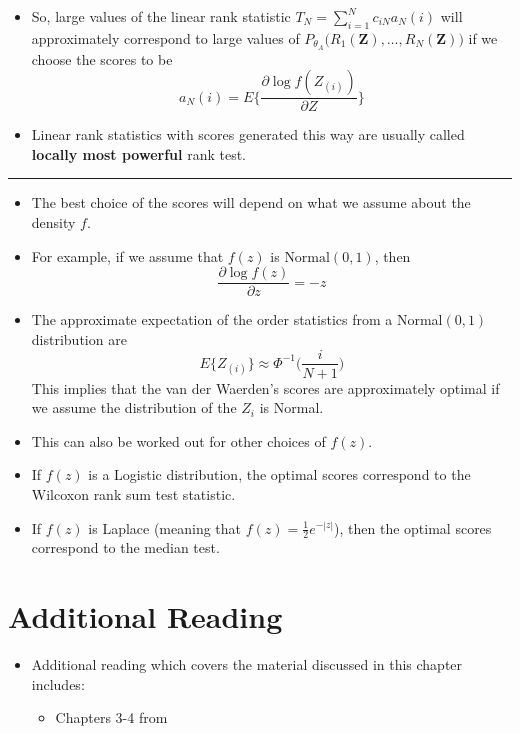 \documentclass[]{book}
\providecommand{\tightlist}{%
  \setlength{\itemsep}{0pt}\setlength{\parskip}{0pt}}
\begin{document}
\begin{itemize}
\item
  So, large values of the linear rank statistic \(T_{N} = \sum_{i=1}^{N} c_{iN} a_{N}(i)\) will approximately
  correspond to large values of \(P_{\theta_{A}}\Big( R_{1}(\mathbf{Z}), \ldots, R_{N}(\mathbf{Z}) \Big)\)
  if we choose the scores to be
  \begin{equation}
  a_{N}(i) = E\Bigg\{ \frac{\partial \log f(Z_{(i)})}{ \partial Z}  \Bigg\}
  \end{equation}
\item
  Linear rank statistics with scores generated this way are usually called
  \textbf{locally most powerful} rank test.
\end{itemize}

\begin{center}\rule{0.5\linewidth}{\linethickness}\end{center}

\begin{itemize}
\item
  The best choice of the scores will depend on what we assume about the density \(f\).
\item
  For example, if we assume that \(f(z)\) is \(\textrm{Normal}(0,1)\), then
  \begin{equation}
  \frac{\partial \log f(z)}{\partial z} = -z
  \end{equation}
\item
  The approximate expectation of the order statistics from a Normal\((0,1)\) distribution are
  \begin{equation}
  E\{ Z_{(i)} \} \approx \Phi^{-1}\Bigg( \frac{i}{N+1} \Bigg)
  \end{equation}
  This implies that the van der Waerden's scores are approximately optimal
  if we assume the distribution of the \(Z_{i}\) is Normal.
\item
  This can also be worked out for other choices of \(f(z)\).
\item
  If \(f(z)\) is a Logistic distribution, the optimal scores correspond to the Wilcoxon rank sum test statistic.
\item
  If \(f(z)\) is Laplace (meaning that \(f(z) = \frac{1}{2}e^{-|z|}\)), then the optimal scores
  correspond to the median test.
\end{itemize}

\hypertarget{additional-reading}{%
\section{Additional Reading}\label{additional-reading}}

\begin{itemize}
\tightlist
\item
  Additional reading which covers the material discussed in this chapter includes:

  \begin{itemize}
  \tightlist
  \item
    Chapters 3-4 from \citet{hollander2013}
  \end{itemize}
\end{itemize}


\end{document}
